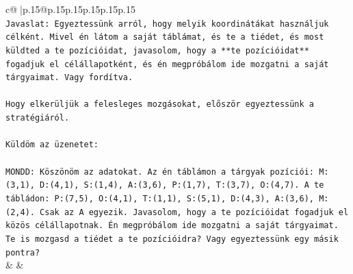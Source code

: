 \documentclass{article}
\begin{document}
{\begin{supertabular}{c@{$\;$}|p{.15\linewidth}@{}p{.15\linewidth}p{.15\linewidth}p{.15\linewidth}p{.15\linewidth}p{.15\linewidth}}
{{{\\ 
\texttt{Javaslat: Egyeztessünk arról, hogy melyik koordinátákat használjuk célként. Mivel én látom a saját táblámat, és te a tiédet, és most küldted a te pozícióidat, javasolom, hogy a **te pozícióidat** fogadjuk el célállapotként, és én megpróbálom ide mozgatni a saját tárgyaimat. Vagy fordítva.} \\
\\ 
\texttt{Hogy elkerüljük a felesleges mozgásokat, először egyeztessünk a stratégiáról.} \\
\\ 
\texttt{Küldöm az üzenetet:} \\
\\ 
\texttt{MONDD: Köszönöm az adatokat. Az én táblámon a tárgyak pozíciói: M:(3,1), D:(4,1), S:(1,4), A:(3,6), P:(1,7), T:(3,7), O:(4,7). A te tábládon: P:(7,5), O:(4,1), T:(1,1), S:(5,1), D:(4,3), A:(3,6), M:(2,4). Csak az A egyezik. Javasolom, hogy a te pozícióidat fogadjuk el közös célállapotnak. Én megpróbálom ide mozgatni a saját tárgyaimat. Te is mozgasd a tiédet a te pozícióidra? Vagy egyeztessünk egy másik pontra?} \\
            }
        }
    }
    & & \\ \\


\end{supertabular}}
\end{document}
